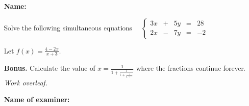 \documentclass[8pt]{exam}
\begin{document}
\textbf{Name:}

\begin{questions}
\question[4] Solve the following simultaneous equations
$ \quad
\left\{\begin{array}{ccccc}
 3x  & + & 5y & = & 28 \\
 2x  & - & 7y & = & -2
\end{array}\right.
$
\fillwithdottedlines{5cm}

\question Let $\displaystyle f(x) = \frac{4-2x}{x+3}.$

\vfill

\question \textbf{Bonus.} Calculate the value of $\displaystyle x = \frac{1}{1+\frac{1}{1+\frac{1}{1+ \cdots}}}$ where the fractions continue forever. \hfill \emph{Work overleaf.}



\end{questions}

\begin{tcolorbox}

\textbf{Name of examiner:}

\begin{center}
\gradetable[h][questions]
\end{center}

\end{tcolorbox}
\end{document}
